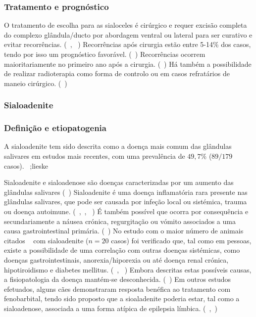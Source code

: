 \subsubsection{Tratamento e prognóstico}

O tratamento de escolha para as sialoceles é cirúrgico e requer excisão completa do complexo glândula/ducto por abordagem ventral ou lateral para ser curativo e evitar recorrências. (~\cite{Poirier2018}, ~\cite{Swieton2022}) Recorrências após cirurgia estão entre 5-14\% dos casos, tendo por isso um prognóstico favorável. (~\cite{Poirier2018}) Recorrências ocorrem maioritariamente no primeiro ano após a cirurgia. (~\cite{Swieton2022}) Há também a possibilidade de realizar radioterapia como forma de controlo ou em casos refratários de maneio cirúrgico. (~\cite{Poirier2018})

\subsubsection{Sialoadenite}
\subsubsection{Definição e etiopatogenia}
A sialoadenite tem sido descrita como a doença mais comum das glândulas salivares em estudos mais recentes, com uma prevalência de $49,7\%$  ($89/179$ casos). ~\cite{McGill2009};lieske

Sialoadenite e sialoadenose são doenças caracterizadas por um aumento das glândulas salivares (~\cite{Enache2025}) Sialoadenite é uma doença inflamatória rara presente nas glândulas salivares, que pode ser causada por infeção local ou sistémica, trauma ou doença autoimune. (~\cite{supurativa},~\cite{11cases}, ~\cite{sialadenite}) É também possível que ocorra por consequência e secundariamente a náusea crónica, regurgitação ou vómito associados a uma causa gastrointestinal primária. (~\cite{McGill2009}) No estudo com o maior número de animais citados ~\cite{Kumar2017} com sialoadenite ($n=20$ casos) foi verificado que, tal como em pessoas, existe a possibilidade de uma correlação com outras doenças sistémicas, como doenças gastrointestinais, anorexia/hiporexia ou até doença renal crónica, hipotiroidismo e diabetes mellitus. (~\cite{11cases}, ~\cite{Enache2025}) Embora descritas estas possíveis causas, a fisiopatologia da doença mantém-se desconhecida. (~\cite{sialadenite}) Em outros estudos  efetuados, alguns cães demonstraram resposta benéfica ao tratamento com fenobarbital, tendo sido proposto que a sioaladenite   poderia estar, tal como a sialoadenose, associada a uma forma atípica de epilepsia límbica. (~\cite{Martinez2018},~\cite{Park2022}) 
